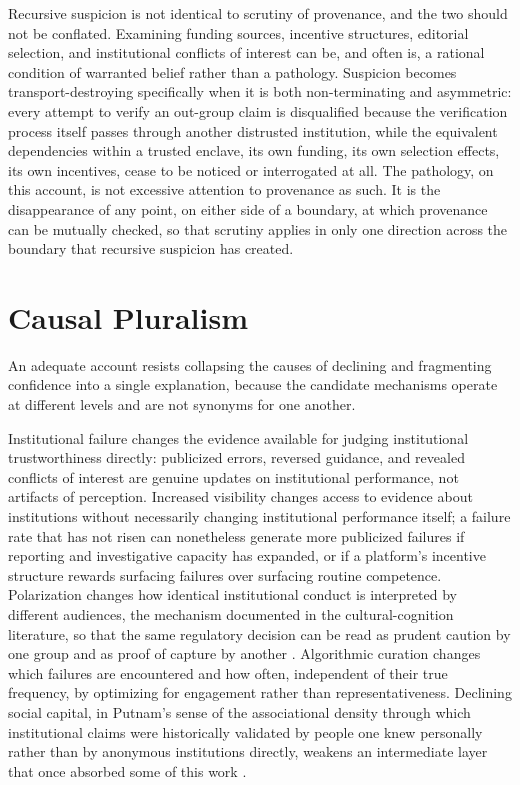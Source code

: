 \documentclass[11pt]{article}
\begin{document}
Recursive suspicion is not identical to scrutiny of provenance, and the two should not be conflated. Examining funding sources, incentive structures, editorial selection, and institutional conflicts of interest can be, and often is, a rational condition of warranted belief rather than a pathology. Suspicion becomes transport-destroying specifically when it is both non-terminating and asymmetric: every attempt to verify an out-group claim is disqualified because the verification process itself passes through another distrusted institution, while the equivalent dependencies within a trusted enclave, its own funding, its own selection effects, its own incentives, cease to be noticed or interrogated at all. The pathology, on this account, is not excessive attention to provenance as such. It is the disappearance of any point, on either side of a boundary, at which provenance can be mutually checked, so that scrutiny applies in only one direction across the boundary that recursive suspicion has created.

\section{Causal Pluralism}

An adequate account resists collapsing the causes of declining and fragmenting confidence into a single explanation, because the candidate mechanisms operate at different levels and are not synonyms for one another.

Institutional failure changes the evidence available for judging institutional trustworthiness directly: publicized errors, reversed guidance, and revealed conflicts of interest are genuine updates on institutional performance, not artifacts of perception. Increased visibility changes access to evidence about institutions without necessarily changing institutional performance itself; a failure rate that has not risen can nonetheless generate more publicized failures if reporting and investigative capacity has expanded, or if a platform's incentive structure rewards surfacing failures over surfacing routine competence. Polarization changes how identical institutional conduct is interpreted by different audiences, the mechanism documented in the cultural-cognition literature, so that the same regulatory decision can be read as prudent caution by one group and as proof of capture by another \citep{kahan2011}. Algorithmic curation changes which failures are encountered and how often, independent of their true frequency, by optimizing for engagement rather than representativeness. Declining social capital, in Putnam's sense of the associational density through which institutional claims were historically validated by people one knew personally rather than by anonymous institutions directly, weakens an intermediate layer that once absorbed some of this work \citep{putnam2000}.
\end{document}
